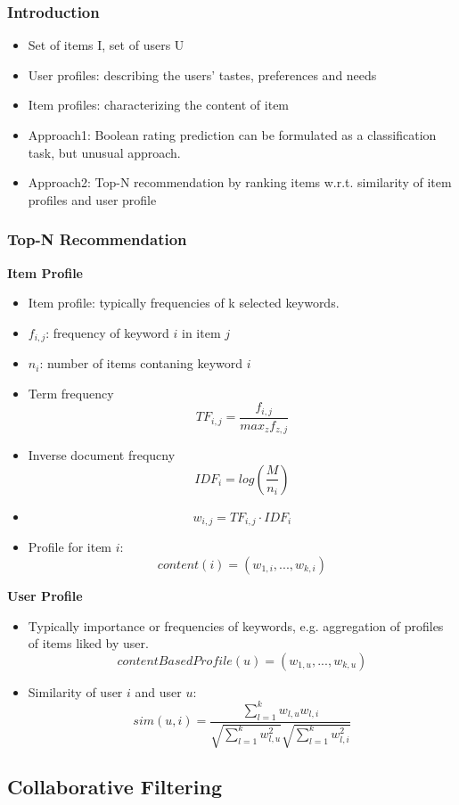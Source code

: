 \documentclass[../notes.tex]{subfiles}
\begin{document}
\subsubsection{Introduction}
\begin{itemize}
  \item Set of items I, set of users U
  \item User profiles: describing the users' tastes, preferences and needs 
  \item Item profiles: characterizing the content of item
  \item Approach1: Boolean rating prediction can be formulated as a classification task, but unusual approach.
  \item Approach2: Top-N recommendation by ranking items w.r.t. similarity of item profiles and user profile 
\end{itemize}

\subsubsection{Top-N Recommendation}
\textbf{Item Profile}
\begin{itemize}
  \item Item profile: typically frequencies of k selected keywords.
  \item $f_{i,j}$: frequency of keyword $i$ in item $j$
  \item $n_i$: number of items contaning keyword $i$
  \item Term frequency $$TF_{i,j} = \frac{f_{i,j}}{max_z f_{z,j}}$$
  \item Inverse document frequcny $$IDF_i = log(\frac{M}{n_i})$$
  \item $$w_{i,j} = TF_{i,j} \cdot IDF_i$$
  \item Profile for item $i$: $$content(i) = (w_{1,i}, ..., w_{k,i})$$
\end{itemize}

\textbf{User Profile}
\begin{itemize}
  \item Typically importance or frequencies of keywords, e.g. aggregation of profiles of items liked by user. $$contentBasedProfile(u) = (w_{1,u}, ..., w_{k,u})$$
  \item Similarity of user $i$ and user $u$: $$sim(u,i) = \frac{\sum_{l=1}^{k} w_{l,u} w_{l,i}}{\sqrt{\sum_{l=1}^{k} w_{l,u}^2}\sqrt{\sum_{l=1}^{k} w_{l,i}^2}}$$
\end{itemize}

\subsection{Collaborative Filtering}
\end{document}
